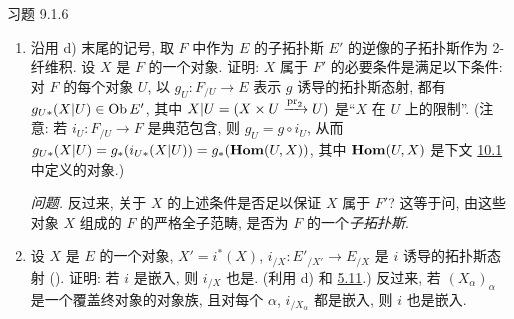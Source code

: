 \begin{enonce*}[remark]{习题 9.1.6}
\begin{enumerate}
\item 沿用 d) 末尾的记号,
取 $F$ 中作为 $E$ 的子拓扑斯 $E'$ 的逆像的子拓扑斯作为 2-纤维积.
设 $X$ 是 $F$ 的一个对象.
证明: $X$ 属于 $F'$ 的必要条件是满足以下条件:
对 $F$ 的每个对象 $U$,
以 $g_U:F_{/U}\rightarrow E$ 表示 $g$ 诱导的拓扑斯态射,
都有 $g_{U\ast}(X|U)\in\operatorname{Ob} E'$, 其中
$X|U=(X\times U\xrightarrow{\operatorname{pr}_2}U)$ 是“$X$ 在 $U$ 上的限制”.
(注意: 若 $i_U:F_{/U}\rightarrow F$ 是典范包含,
则 $g_U=g\circ i_U$,
从而 $g_{U\ast}(X|U)=g_{\ast}(i_{U\ast}(X|U))=g_{\ast}(\operatorname{\mathbf{Hom}}(U,X))$,
其中 $\operatorname{\mathbf{Hom}}(U,X)$ 是下文 \hyperref[IV.prop10.1]{10.1} 中定义的对象.)

\noindent \emph{问题.}
反过来, 关于 $X$ 的上述条件是否足以保证 $X$ 属于 $F'$?
这等于问, 由这些对象 $X$ 组成的 $F$ 的严格全子范畴,
是否为 $F$ 的一个\emph{子拓扑斯}.

\item 设 $X$ 是 $E$ 的一个对象, $X'=i^{\ast}(X)$,
$i_{/X}:E'_{/X'}\rightarrow E_{/X}$ 是 $i$ 诱导的拓扑斯态射
().
证明: 若 $i$ 是嵌入, 则 $i_{/X}$ 也是.
(利用 d) 和 \hyperref[IV.prop5.11]{5.11}.)
反过来, 若 $(X_{\alpha})_{\alpha}$ 是一个覆盖终对象的对象族,
且对每个 $\alpha$, $i_{/X_{\alpha}}$ 都是嵌入, 则 $i$ 也是嵌入.
\end{enumerate}
\end{enonce*}



